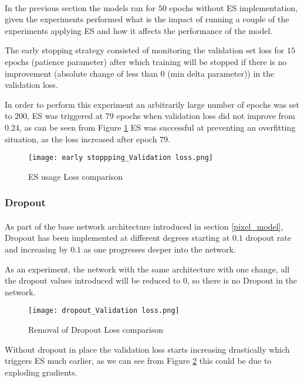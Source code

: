 \paragraph{}
In the previous section the models ran for $50$ epochs without \gls{ES} implementation, given the experiments performed what is the impact of running a couple of the experiments applying \gls{ES} and how it affects the performance of the model.

The early stopping strategy consisted of monitoring the validation set loss for $15$ epochs (patience parameter) after which training will be stopped if there is no improvement (absolute change of less than $0$ (min delta parameter)) in the validation loss.

In order to perform this experiment an arbitrarily large number of epochs was set to $200$, \gls{ES} was triggered at $79$ epochs when validation loss did not improve from $0.24$, as can be seen from Figure \ref{es_loss} \gls{ES} was successful at preventing an overfitting situation, as the loss increased after epoch $79$.

\begin{figure}[hbt!]
    \centering
    \texttt{[image: early stoppping\_Validation loss.png]}
    \caption{\gls{ES} usage Loss comparison}
    \label{es_loss}
\end{figure}

\subsubsection{Dropout}
\paragraph{}
As part of the base network architecture introduced in section \ref{pixel_model}, Dropout has been implemented at different degrees starting at $0.1$ dropout rate and increasing by $0.1$ as one progresses deeper into the network.

As an experiment, the network with the same architecture with one change, all the dropout values introduced will be reduced to $0$, so there is no Dropout in the network.

\begin{figure}[hbt!]
    \centering
    \texttt{[image: dropout\_Validation loss.png]}
    \caption{Removal of Dropout Loss comparison}
    \label{dropout_loss}
\end{figure}

Without dropout in place the validation loss starts increasing drastically which triggers \gls{ES} much earlier, as we can see from Figure \ref{dropout_loss} this could be due to exploding gradients.


